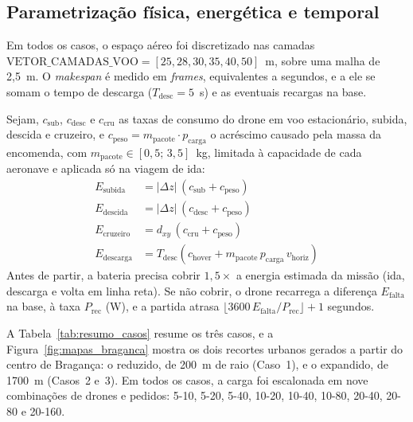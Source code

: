 \subsection{Parametrização física, energética e temporal}

Em todos os casos, o espaço aéreo foi discretizado nas camadas $\text{VETOR\_CAMADAS\_VOO} = [25, 28, 30, 35, 40, 50]$~m, sobre uma malha de 2,5~m. O \textit{makespan} é medido em \textit{frames}, equivalentes a segundos, e a ele se somam o tempo de descarga ($T_{\text{desc}} = 5$~s) e as eventuais recargas na base.


Sejam, $c_{\text{sub}}$, $c_{\text{desc}}$ e $c_{\text{cru}}$ as taxas de consumo do drone em voo estacionário, subida, descida e cruzeiro, e $c_{\text{peso}} = m_{\text{pacote}} \cdot p_{\text{carga}}$ o acréscimo causado pela massa da encomenda, com $m_{\text{pacote}} \in [0{,}5;\,3{,}5]$~kg, limitada à capacidade de cada aeronave e aplicada só na viagem de ida:
\begin{align}
E_{\text{subida}} &= |\Delta z|\,(c_{\text{sub}} + c_{\text{peso}}) \\
E_{\text{descida}} &= |\Delta z|\,(c_{\text{desc}} + c_{\text{peso}}) \\
E_{\text{cruzeiro}} &= d_{xy}\,(c_{\text{cru}} + c_{\text{peso}}) \\
E_{\text{descarga}} &= T_{\text{desc}}\left(c_{\text{hover}} + m_{\text{pacote}}\, p_{\text{carga}}\, v_{\text{horiz}}\right)
\end{align}
Antes de partir, a bateria precisa cobrir $1{,}5\times$ a energia estimada da missão (ida, descarga e volta em linha reta). Se não cobrir, o drone recarrega a diferença $E_{\text{falta}}$ na base, à taxa $P_{\text{rec}}$ (W), e a partida atrasa $\lfloor 3600\,E_{\text{falta}}/P_{\text{rec}} \rfloor + 1$ segundos.

A Tabela~\ref{tab:resumo_casos} resume os três casos, e a Figura~\ref{fig:mapas_braganca} mostra os dois recortes urbanos gerados a partir do centro de Bragança: o reduzido, de 200~m de raio (Caso~1), e o expandido, de 1700~m (Casos~2 e~3). Em todos os casos, a carga foi escalonada em nove combinações de drones e pedidos: 5-10, 5-20, 5-40, 10-20, 10-40, 10-80, 20-40, 20-80 e 20-160.

